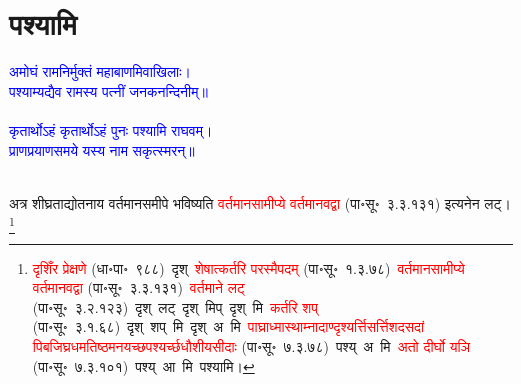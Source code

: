 \section[पश्यामि]{पश्यामि}
\centering\textcolor{blue}{अमोघं रामनिर्मुक्तं महाबाणमिवाखिलाः।\nopagebreak\\
पश्याम्यद्यैव रामस्य पत्नीं जनकनन्दिनीम्॥}\nopagebreak\\
\\
\centering\textcolor{blue}{कृतार्थोऽहं कृतार्थोऽहं पुनः पश्यामि राघवम्।\nopagebreak\\
प्राणप्रयाणसमये यस्य नाम सकृत्स्मरन्॥}\nopagebreak\\
\\
\fontsize{14}{21}\selectfont\begin{sloppypar}\justifying\noindent\hspace{10mm} अत्र शीघ्रता\-द्योतनाय वर्तमान\-समीपे भविष्यति \textcolor{red}{वर्तमान\-सामीप्ये वर्तमानवद्वा} (पा॰सू॰~३.३.१३१) इत्यनेन लट्।\footnote{\textcolor{red}{दृशिँर प्रेक्षणे} (धा॰पा॰~९८८)~\arrow दृश्~\arrow \textcolor{red}{शेषात्कर्तरि परस्मैपदम्} (पा॰सू॰~१.३.७८)~\arrow \textcolor{red}{वर्तमान\-सामीप्ये वर्तमानवद्वा} (पा॰सू॰~३.३.१३१)~\arrow \textcolor{red}{वर्तमाने लट्} (पा॰सू॰~३.२.१२३)~\arrow दृश्~लट्~\arrow दृश्~मिप्~\arrow दृश्~मि~\arrow \textcolor{red}{कर्तरि शप्‌} (पा॰सू॰~३.१.६८)~\arrow दृश्~शप्~मि~\arrow दृश्~अ~मि~\arrow \textcolor{red}{पाघ्रा\-ध्मास्थाम्ना\-दाण्दृश्यर्त्ति\-सर्त्तिशदसदां पिब\-जिघ्र\-धम\-तिष्ठ\-मन\-यच्छ\-पश्यर्च्छ\-धौ\-शीय\-सीदाः} (पा॰सू॰~७.३.७८)~\arrow पश्य्~अ~मि~\arrow \textcolor{red}{अतो दीर्घो यञि} (पा॰सू॰~७.३.१०१)~\arrow पश्य्~आ~मि~\arrow पश्यामि।}\end{sloppypar}
